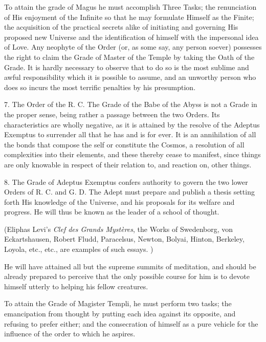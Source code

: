 To attain the grade of Magus he must accomplish Three Tasks; the renunciation of His enjoyment of the Infinite so that he may formulate Himself as the Finite; the acquisition of the practical secrets alike of initiating and governing His proposed new Universe and the identification of himself with the impersonal idea of Love. Any neophyte of the Order (or, as some say, any person soever) possesses the right to claim the Grade of Master of the Temple by taking the Oath of the Grade. It is hardly necessary to observe that to do so is the most sublime and awful responsibility which it is possible to assume, and an unworthy person who does so incurs the most terrific penalties by his presumption.

\vspace{\baselineskip}

7. The Order of the R. C. The Grade of the Babe of the Abyss is not a Grade in the proper sense, being rather a passage between the two Orders. Its characteristics are wholly negative, as it is attained by the resolve of the Adeptus Exemptus to surrender all that he has and is for ever. It is an annihilation of all the bonds that compose the self or constitute the Cosmos, a resolution of all complexities into their elements, and these thereby cease to manifest, since things are only knowable in respect of their relation to, and reaction on, other things.

\vspace{\baselineskip}

8. The Grade of Adeptus Exemptus confers authority to govern the two lower Orders of R. C. and G. D. The Adept must prepare and publish a thesis setting forth His knowledge of the Universe, and his proposals for its welfare and progress. He will thus be known as the leader of a school of thought.

(Eliphas Levi's \textit{Clef des Grands Myst\`{e}res}, the Works of Swedenborg, von Eckartshausen, Robert Fludd, Paracelsus, Newton, Bolyai, Hinton, Berkeley, Loyola, etc., etc., are examples of such essays. )

He will have attained all but the supreme summits of meditation, and should be already prepared to perceive that the only possible course for him is to devote himself utterly to helping his fellow creatures.

To attain the Grade of Magister Templi, he must perform two tasks; the emancipation from thought by putting each idea against its opposite, and refusing to prefer either; and the consecration of himself as a pure vehicle for the influence of the order to which he aspires.

